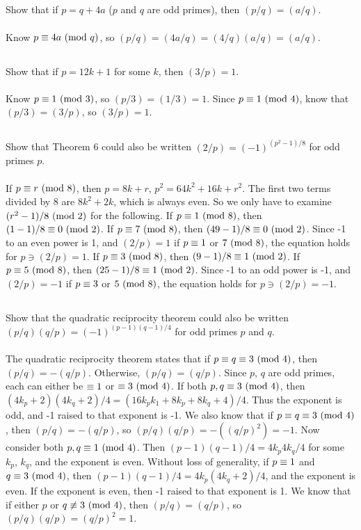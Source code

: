 \documentclass{article} \usepackage{amsmath}
\begin{document}
\subsection{}
Show that if $p = q + 4a$ ($p$ and $q$ are odd primes),
then $(p/q) = (a/q)$.\\~\\
Know $p \equiv 4a \ (\mathrm{mod}\ q)$, so $(p/q) = (4a/q) = (4/q)(a/q) = (a/q)$.

\subsection{}
Show that if $p = 12k + 1$ for some $k$, then $(3/p) = 1$.\\~\\
Know $p \equiv 1 \ (\mathrm{mod}\ 3)$, so $(p/3) = (1/3) = 1$.
Since $p \equiv 1 \ (\mathrm{mod}\ 4)$, know that $(p/3) = (3/p)$, so $(3/p) = 1$.

\subsection{}
Show that Theorem 6 could also be written $(2/p) = (-1)^{(p^2-1)/8}$
for odd primes $p$.\\~\\
If $p \equiv r \ (\mathrm{mod}\ 8)$, then $p = 8k + r$, $p^2 = 64k^2 + 16k + r^2$.
The first two terms divided by 8 are $8k^2 + 2k$, which is always even.
So we only have to examine $(r^2 - 1)/8 \ (\mathrm{mod}\ 2)$ for the following.
If $p \equiv 1 \ (\mathrm{mod}\ 8)$, then $(1 - 1)/8 \equiv 0 \ (\mathrm{mod}\ 2)$.
If $p \equiv 7 \ (\mathrm{mod}\ 8)$, then $(49 - 1)/8 \equiv 0 \ (\mathrm{mod}\ 2)$.
Since -1 to an even power is 1, and $(2/p) = 1$ if $p \equiv 1$ or $7 \ (\mathrm{mod}\ 8)$,
the equation holds for $p \ni (2/p) = 1$.
If $p \equiv 3 \ (\mathrm{mod}\ 8)$, then $(9 - 1)/8 \equiv 1 \ (\mathrm{mod}\ 2)$.
If $p \equiv 5 \ (\mathrm{mod}\ 8)$, then $(25 - 1)/8 \equiv 1 \ (\mathrm{mod}\ 2)$.
Since -1 to an odd power is -1, and $(2/p) = -1$ if $p \equiv 3$ or $5 \ (\mathrm{mod}\ 8)$,
the equation holds for $p \ni (2/p) = -1$.

\subsection{}
Show that the quadratic reciprocity theorem could also be written
$(p/q)(q/p) = (-1)^{(p-1)(q-1)/4}$ for odd primes $p$ and $q$.\\~\\
The quadratic reciprocity theorem states that if $p \equiv q \equiv 3 \ (\mathrm{mod}\ 4)$,
then $(p/q) = -(q/p)$. Otherwise, $(p/q) = (q/p)$.
Since $p$, $q$ are odd primes, each can either be $\equiv 1$ or $\equiv 3 \ (\mathrm{mod}\ 4)$.
If both $p, q \equiv 3 \ (\mathrm{mod}\ 4)$, then $(4k_p + 2)(4k_q + 2)/4 =
(16k_pk_1 + 8k_p + 8k_q + 4)/4$.
Thus the exponent is odd, and -1 raised to that exponent is -1.
We also know that if $p \equiv q \equiv 3 \ (\mathrm{mod}\ 4)$, then $(p/q) = -(q/p)$,
so $(p/q)(q/p) = -((q/p)^2) = -1$.
Now consider both $p, q \equiv 1 \ (\mathrm{mod}\ 4)$.
Then $(p-1)(q-1)/4 = 4k_p4k_q/4$ for some $k_p$, $k_q$, and the exponent is even.
Without loss of generality, if $p \equiv 1$ and $q \equiv 3 \ (\mathrm{mod}\ 4)$,
then $(p-1)(q-1)/4 = 4k_p(4k_q + 2)/4$, and the exponent is even.
If the exponent is even, then -1 raised to that exponent is 1.
We know that if either $p$ or $q \not\equiv 3 \ (\mathrm{mod}\ 4)$, then $(p/q) = (q/p)$,
so $(p/q)(q/p) = (q/p)^2 = 1$.
\end{document}
